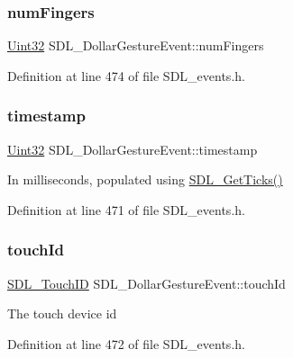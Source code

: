 \subsubsection{\texorpdfstring{numFingers}{numFingers}}
{\footnotesize\ttfamily \mbox{\hyperlink{_s_d_l__stdinc_8h_add440eff171ea5f55cb00c4a9ab8672d}{Uint32}} S\+D\+L\+\_\+\+Dollar\+Gesture\+Event\+::num\+Fingers}



Definition at line 474 of file S\+D\+L\+\_\+events.\+h.

\mbox{\label{struct_s_d_l___dollar_gesture_event_a3bccd8ebdf30b79c0f4074f6471ec583}} 
\subsubsection{\texorpdfstring{timestamp}{timestamp}}
{\footnotesize\ttfamily \mbox{\hyperlink{_s_d_l__stdinc_8h_add440eff171ea5f55cb00c4a9ab8672d}{Uint32}} S\+D\+L\+\_\+\+Dollar\+Gesture\+Event\+::timestamp}

In milliseconds, populated using \mbox{\hyperlink{_s_d_l__timer_8h_a0b9bc71d6287e0ffafdc3419760fe2b3}{S\+D\+L\+\_\+\+Get\+Ticks()}} 

Definition at line 471 of file S\+D\+L\+\_\+events.\+h.

\mbox{\label{struct_s_d_l___dollar_gesture_event_a40402f6911ed0dba48e6b23aa02bd83d}} 
\subsubsection{\texorpdfstring{touchId}{touchId}}
{\footnotesize\ttfamily \mbox{\hyperlink{_s_d_l__touch_8h_a10f5f86abe4ea8308a8706bd5d3b337a}{S\+D\+L\+\_\+\+Touch\+ID}} S\+D\+L\+\_\+\+Dollar\+Gesture\+Event\+::touch\+Id}

The touch device id 

Definition at line 472 of file S\+D\+L\+\_\+events.\+h.

\mbox{\label{struct_s_d_l___dollar_gesture_event_ac7f6948754a1b2eb36edde043bf75ce9}} 
